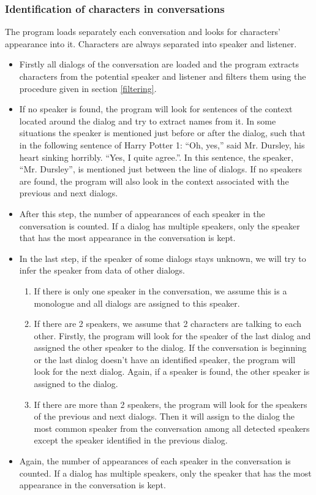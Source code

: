 \documentclass[a4paper, 12pt]{report}
\begin{document}
\subsubsection{Identification of characters in conversations}
The program loads separately each conversation and looks for characters' appearance into it. Characters are always separated into speaker and listener. \\
\begin{itemize}
\item Firstly all dialogs of the conversation are loaded and the program extracts characters from the potential speaker and listener and filters them using the procedure given in section \ref{filtering}.

\item If no speaker is found, the program will look for sentences of the context located around the dialog and try to extract names from it. In some situations the speaker is mentioned just before or after the dialog, such that in the following sentence of Harry Potter 1: “Oh, yes,” said Mr. Dursley, his heart sinking horribly. “Yes, I quite agree.”. In this sentence, the speaker, ``Mr. Dursley'', is mentioned just between the line of dialogs. If no speakers are found, the program will also look in the context associated with the previous and next dialogs.\\

\item After this step, the number of appearances of each speaker in the conversation is counted. If a dialog has multiple speakers, only the speaker that has the most appearance in the conversation is kept.

\item In the last step, if the speaker of some dialogs stays unknown, we will try to infer the speaker from data of other dialogs.
\begin{enumerate}
\item If there is only one speaker in the conversation, we assume this is a monologue and all dialogs are assigned to this speaker.
\item If there are 2 speakers, we assume that 2 characters are talking to each other. Firstly, the program will look for the speaker of the last dialog and assigned the other speaker to the dialog. If the conversation is beginning or the last dialog doesn't have an identified speaker, the program will look for the next dialog. Again, if a speaker is found, the other speaker is assigned to the dialog.
\item If there are more than 2 speakers, the program will look for the speakers of the previous and next dialogs. Then it will assign to the dialog the most common speaker from the conversation among all detected speakers except the speaker identified in the previous dialog.
\end{enumerate}
\item Again, the number of appearances of each speaker in the conversation is counted. If a dialog has multiple speakers, only the speaker that has the most appearance in the conversation is kept.


\end{itemize}
\end{document}
